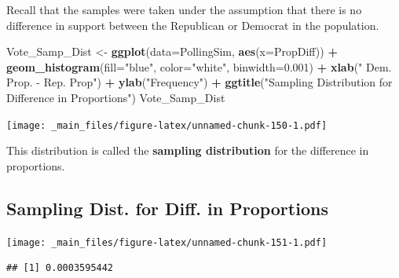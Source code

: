 \documentclass[]{book}
\newenvironment{Shaded}{\begin{snugshade}}{\end{snugshade}}
\newcommand{\KeywordTok}[1]{\textcolor[rgb]{0.13,0.29,0.53}{\textbf{#1}}}
\newcommand{\DataTypeTok}[1]{\textcolor[rgb]{0.13,0.29,0.53}{#1}}
\newcommand{\FloatTok}[1]{\textcolor[rgb]{0.00,0.00,0.81}{#1}}
\newcommand{\StringTok}[1]{\textcolor[rgb]{0.31,0.60,0.02}{#1}}
\newcommand{\OperatorTok}[1]{\textcolor[rgb]{0.81,0.36,0.00}{\textbf{#1}}}
\newcommand{\NormalTok}[1]{#1}
\begin{document}
Recall that the samples were taken under the assumption that there is no
difference in support between the Republican or Democrat in the
population.

\begin{Shaded}
\begin{Highlighting}[]
\NormalTok{Vote_Samp_Dist <-}\StringTok{ }\KeywordTok{ggplot}\NormalTok{(}\DataTypeTok{data=}\NormalTok{PollingSim, }\KeywordTok{aes}\NormalTok{(}\DataTypeTok{x=}\NormalTok{PropDiff)) }\OperatorTok{+}\StringTok{  }\KeywordTok{geom_histogram}\NormalTok{(}\DataTypeTok{fill=}\StringTok{"blue"}\NormalTok{, }\DataTypeTok{color=}\StringTok{"white"}\NormalTok{, }\DataTypeTok{binwidth=}\FloatTok{0.001}\NormalTok{) }\OperatorTok{+}\StringTok{ }
\StringTok{  }\KeywordTok{xlab}\NormalTok{(}\StringTok{" Dem. Prop. - Rep. Prop"}\NormalTok{) }\OperatorTok{+}\StringTok{ }\KeywordTok{ylab}\NormalTok{(}\StringTok{"Frequency"}\NormalTok{) }\OperatorTok{+}\StringTok{ }
\StringTok{  }\KeywordTok{ggtitle}\NormalTok{(}\StringTok{"Sampling Distribution for Difference in Proportions"}\NormalTok{)}
\NormalTok{Vote_Samp_Dist }
\end{Highlighting}
\end{Shaded}

\texttt{[image: \_main\_files/figure-latex/unnamed-chunk-150-1.pdf]}

This distribution is called the \textbf{sampling distribution} for the
difference in proportions.

\subsection{Sampling Dist. for Diff. in
Proportions}\label{sampling-dist.-for-diff.-in-proportions}

\texttt{[image: \_main\_files/figure-latex/unnamed-chunk-151-1.pdf]}

\begin{Shaded}
\end{Shaded}

\begin{verbatim}
## [1] 0.0003595442
\end{verbatim}

\begin{Shaded}
\end{Shaded}
\end{document}

